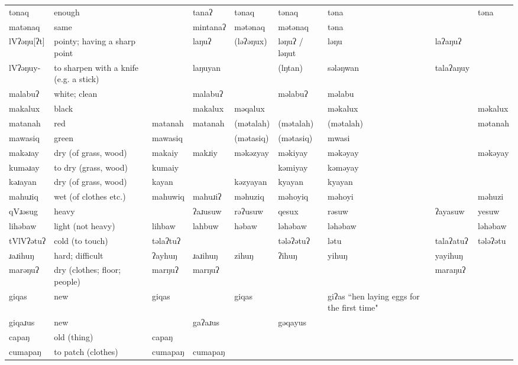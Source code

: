 \begin{landscape}
\begin{longtable}{*{9}{p{}}}
\text{*}tənaq & enough &  & tanaʔ & tənaq & tənaq & təna &  & təna\\
\text{*}matənaq & same &  & mintanaʔ & mətənaq & mətənaq & təna &  & \\
\text{*}lVʔəŋu[ʔt] & pointy; having a sharp point &  & laŋuʔ & (ləʔəŋux) & ləŋuʔ / ləŋut & ləŋu & laʔaŋuʔ & \\
\text{*}lVʔəŋuy- & to sharpen with a knife (e.g. a stick) &  & laŋuyan &  & (lŋtan) & sələŋwan & talaʔaŋuy & \\
\text{*}malabuʔ & white; clean &  & malabuʔ &  & məlabuʔ & məlabu &  & \\
\text{*}makalux & black &  & makalux & məqalux &  & məkalux &  & məkalux\\
\text{*}matanah & red & matanah & matanah & (mətalah) & (mətalah) & (mətalah) &  & mətanah\\
\text{*}mawasiq & green & mawasiq &  & (mətasiq) & (mətasiq) & mwasi &  & \\
\text{*}makəɹay & dry (of grass, wood) & makaiy & makɹiy & məkəzyay & məkiyay & məkəyay &  & məkəyay\\
\text{*}kuməɹay & to dry (grass, wood) & kumaiy &  &  & kəmiyay & kəməyay &  & \\
\text{*}kəɹayan & dry (of grass, wood) & kayan &  & kəzyayan & kyayan & kyayan &  & \\
\text{*}mahuɹiq & wet (of clothes etc.) & mahuwiq & mahuɹiʔ & məhuziq & məhoyiq & məhoyi &  & məhuzi\\
\text{*}qVɹəsug & heavy &  & ʔaɹusuw & rəʔusuw & qesux & rəsuw & ʔayasuw & yesuw\\
\text{*}lihəbaw & light (not heavy) & lihbaw & lahbuw & həbaw & ləhəbaw & ləhəbaw &  & ləhəbaw\\
\text{*}tVlVʔətuʔ & cold (to touch) & təlaʔtuʔ &  &  & tələʔətuʔ & lətu & talaʔatuʔ & tələʔətu\\
\text{*}ɹaɹihuŋ & hard; difficult & ʔayhuŋ & ɹaɹihuŋ & zihuŋ & ʔihuŋ & yihuŋ & yayihuŋ & \\
\text{*}marəŋuʔ & dry (clothes; floor; people) & marŋuʔ & marŋuʔ &  &  &  & maraŋuʔ & \\
\text{*}giqas & new & giqas &  & giqas &  & giʔas ``hen laying eggs for the first time" &  & \\
\text{*}giqaɹus & new &  & gaʔaɹus &  & gəqayus &  &  & \\
\text{*}capaŋ & old (thing) & capaŋ &  &  &  &  &  & \\
\text{*}cumapaŋ & to patch (clothes) & cumapaŋ & cumapaŋ &  &  &  &  & \\

\end{longtable}
\end{landscape}
